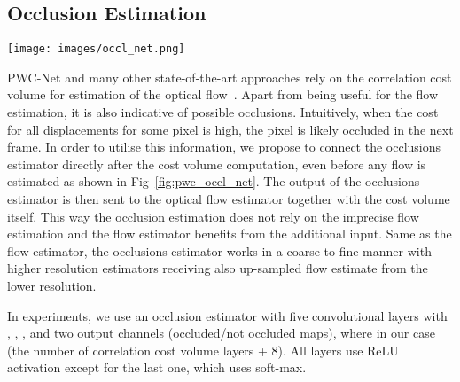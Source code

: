 \documentclass[runningheads]{llncs}
\begin{document}
\subsection{Occlusion Estimation}
\begin{figure*}[t]
\centering
\texttt{[image: images/occl\_net.png]}
\vspace*{1ex}
\caption{ContinualFlow - optical flow and occlusion decoder, which extends
the PWC-Net~\cite{Sun2017} flow decoder for occlusion estimation.
The feature pyramid extractor (in blue) is a convolutional network which produces a feature pyramid given an input image.
A correlation cost volume is computed on each scale from warped features from the second frame using up-sampled flow estimated at a coarser level of decoder.
The cost volume is used to estimate occlusions in occlusion estimator (in magenta). The cost volume and the occlusion map are inputs to the optical flow estimator.
For clarity, the diagram shows only three of the six levels of the ContinualFlow pyramid extractor. The output resolution is quarter of the input reference frame. Please, refer to the text for additional network details and inputs explanation.\vspace*{-1ex}}
\label{fig:pwc_occl_net}
\end{figure*}

PWC-Net and many other state-of-the-art approaches rely on the correlation cost volume for estimation of the optical flow~\cite{Dosovitskiy2015,Ilg2016,Ranjan2016,Sun2017,Meister2017}. Apart from being useful for the flow estimation, it is also indicative of possible occlusions.
Intuitively, when the cost for all displacements for some pixel is high, the pixel is likely occluded in the next frame.
In order to utilise this information, we propose to connect the occlusions estimator directly after the cost volume computation, even before any flow is estimated as shown in Fig~\ref{fig:pwc_occl_net}.
The output of the occlusions estimator is then sent to the optical flow estimator together with the cost volume itself.
This way the occlusion estimation does not rely on the imprecise flow estimation and the flow estimator benefits from the additional input.
Same as the flow estimator, the occlusions estimator works in a coarse-to-fine manner with higher resolution estimators receiving also up-sampled flow estimate from the lower resolution.

In experiments, we use an occlusion estimator with five convolutional layers with , , ,  and two output channels (occluded/not occluded maps), where  in our case (the number of correlation cost volume layers + 8).
All layers use ReLU activation except for the last one, which uses soft-max.
\end{document}
